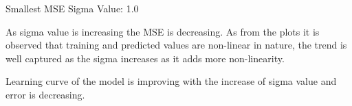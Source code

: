 \begin{enumerate}
Smallest MSE Sigma Value: 1.0

As sigma value is increasing the MSE is decreasing. As from the plots it is observed that training and predicted values are non-linear in nature, the trend is well captured as the sigma increases as it adds more non-linearity.

Learning curve of the model is improving with the increase of sigma value and error is decreasing.

\end{enumerate}